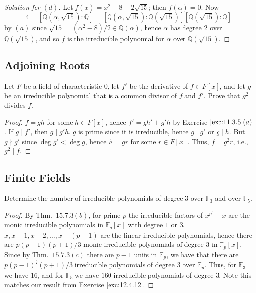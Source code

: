 \documentclass[12pt]{article}
\theoremstyle{remark}
\begin{document}
\begin{proof}[Solution for $(d)$]
  Let $f(x) = x^2 - 8 - 2\sqrt{15}$; then $f(\alpha) = 0$. Now
  \begin{equation*}
    4 = [\mathbb{Q}(\alpha,\sqrt{15}):\mathbb{Q}] = [\mathbb{Q}(\alpha,\sqrt{15}):\mathbb{Q}(\sqrt{15})][\mathbb{Q}(\sqrt{15}):\mathbb{Q}]
  \end{equation*}
  by $(a)$ since $\sqrt{15} = (\alpha^2 - 8)/2 \in \mathbb{Q}(\alpha)$, hence $\alpha$ has degree $2$ over $\mathbb{Q}(\sqrt{15})$, and so $f$ is the irreducible polynomial for $\alpha$ over $\mathbb{Q}(\sqrt{15})$.
\end{proof}

\setcounter{subsection}{5}
\subsection{Adjoining Roots}
\begin{problem}
  Let $F$ be a field of characteristic $0$, let $f'$ be the derivative of $f \in F[x]$, and let $g$ be an irreducible polynomial that is a common divisor of $f$ and $f'$. Prove that $g^2$ divides $f$.
\end{problem}
\begin{proof}
  $f = gh$ for some $h \in F[x]$, hence $f' = gh' + g'h$ by Exercise $\ref{exc:11.3.5}(a)$. If $g \mid f'$, then $g \mid g'h$. $g$ is prime since it is irreducible, hence $g \mid g'$ or $g \mid h$. But $g \nmid g'$ since $\deg g' < \deg g$, hence $h = gr$ for some $r \in F[x]$. Thus, $f = g^2r$, i.e., $g^2 \mid f$.
\end{proof}

\subsection{Finite Fields}
\setcounter{subsubsection}{3}
\begin{problem}
  Determine the number of irreducible polynomials of degree $3$ over $\mathbb{F}_3$ and over $\mathbb{F}_5$.
\end{problem}
\begin{proof}
  By Thm.~$15.7.3(b)$, for prime $p$ the irreducible factors of $x^{p^3} - x$ are the monic irreducible polynomials in $\mathbb{F}_p[x]$ with degree $1$ or $3$. $x,x-1,x-2,\ldots,x-(p-1)$ are the linear irreducible polynomials, hence there are $p(p-1)(p+1)/3$ monic irreducible polynomials of degree $3$ in $\mathbb{F}_p[x]$. Since by Thm.~$15.7.3(c)$ there are $p-1$ units in $\mathbb{F}_p$, we have that there are $p(p-1)^2(p+1)/3$ irreducible polynomials of degree $3$ over $\mathbb{F}_p$. Thus, for $\mathbb{F}_3$ we have $16$, and for $\mathbb{F}_5$ we have $160$ irreducible polynomials of degree $3$. Note this matches our result from Exercise \ref{exc:12.4.12}.
\end{proof}
\end{document}
